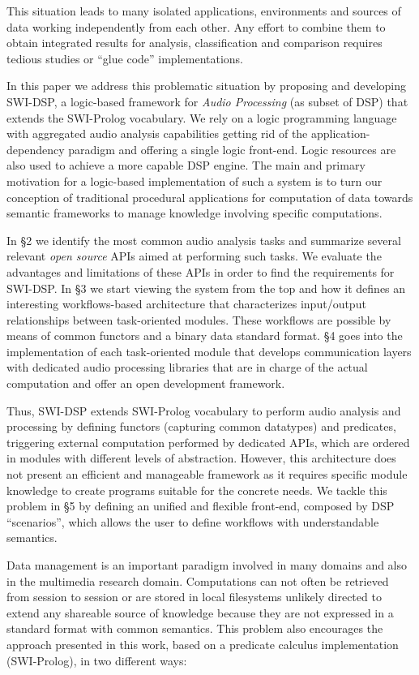 \documentclass[runningheads]{llncs}
\begin{document}
This situation leads to many isolated applications, environments and sources of data working independently from each other. Any effort to combine them to obtain integrated results for analysis, classification and comparison requires tedious studies or ``glue code'' implementations.

In this paper we address this problematic situation by proposing and developing SWI-DSP, a logic-based framework for \textit{Audio Processing} (as subset of DSP) that extends the SWI-Prolog \cite{swi} vocabulary. We rely on a logic programming language with aggregated audio analysis capabilities getting rid of the application-dependency paradigm and offering a single logic front-end. Logic resources are also used to achieve a more capable DSP engine. The main and primary motivation for a logic-based implementation of such a system is to turn our conception of traditional procedural applications for computation of data towards semantic frameworks to manage knowledge involving specific computations.

In \S 2 we identify the most common audio analysis tasks and summarize several relevant \textit{open source} APIs aimed at performing such tasks. We evaluate the advantages and limitations of these APIs in order to find the requirements for SWI-DSP. In \S 3 we start viewing the system from the top and how it defines an interesting workflows-based architecture that characterizes input/output relationships between task-oriented modules. These workflows are possible by means of common functors and a binary data standard format. \S 4 goes into the implementation of each task-oriented module that develops communication layers with dedicated audio processing libraries that are in charge of the actual computation and offer an open development framework.

Thus, SWI-DSP extends SWI-Prolog vocabulary to perform audio analysis and processing by defining functors (capturing common datatypes) and predicates, triggering external computation performed by dedicated APIs, which are ordered in modules with different levels of abstraction. However, this architecture does not present an efficient and manageable framework as it requires specific module knowledge to create programs suitable for the concrete needs. We tackle this problem in \S 5 by defining an unified and flexible front-end, composed by DSP ``scenarios'', which allows the user to define workflows with understandable semantics.

Data management is an important paradigm involved in many domains and also in the multimedia research domain. Computations can not often be retrieved from session to session or are stored in local filesystems unlikely directed to extend any shareable source of knowledge because they are not expressed in a standard format with common semantics. This problem also encourages the approach presented in this work, based on a predicate calculus implementation (SWI-Prolog), in two different ways:
\end{document}
